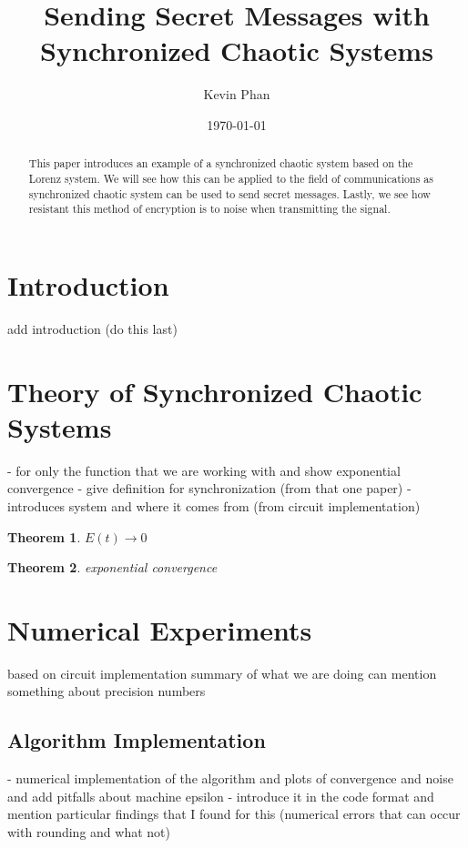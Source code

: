 \documentclass[12pt]{article}
\title{Sending Secret Messages with Synchronized Chaotic Systems}
\author{Kevin Phan}
\date{\today}
\newtheorem{theorem}{Theorem}
\begin{document}
    \maketitle

    \begin{abstract}
      This paper introduces an example of a synchronized chaotic system based on the Lorenz system. We will see how this can be applied to the field of communications as synchronized chaotic system can be used to send secret messages. Lastly, we see how resistant this method of encryption is to noise when transmitting the signal. 
    \end{abstract}

    \newpage

    \tableofcontents

    \newpage

    \section{Introduction}
      add introduction (do this last) \cite{cuomo1993}
    \section{Theory of Synchronized Chaotic Systems}
      - for only the function that we are working with and show exponential convergence 
      - give definition for synchronization (from that one paper)
      - introduces system and where it comes from (from circuit implementation)
      \begin{theorem}
        $E(t) \rightarrow 0$ 
      \end{theorem}
      \begin{theorem}
        exponential convergence 
      \end{theorem}
    \section{Numerical Experiments}
    based on circuit implementation \cite{cuomo1993}
    summary of what we are doing 
    can mention something about precision numbers 
    \subsection{Algorithm Implementation}
    - numerical implementation of the algorithm and plots of convergence and noise and add pitfalls about machine epsilon 
    - introduce it in the code format and mention particular findings that I found for this (numerical errors that can occur with rounding and what not)
\end{document}
